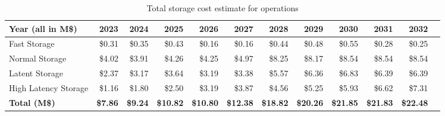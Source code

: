 \tiny \begin{longtable} { |p{}  |r  |r  |r  |r  |r  |r  |r  |r  |r  |r  |r |} 
\caption{Total storage cost estimate for operations \label{tab:opsStorageCost}}\\ 
\hline 
\textbf{Year (all in M\$)}&\textbf{2023}&\textbf{2024}&\textbf{2025}&\textbf{2026}&\textbf{2027}&\textbf{2028}&\textbf{2029}&\textbf{2030}&\textbf{2031}&\textbf{2032} \\ \hline
{Fast Storage}&{\$0.31}&{\$0.35}&{\$0.43}&{\$0.16}&{\$0.16}&{\$0.44}&{\$0.48}&{\$0.55}&{\$0.28}&{\$0.25} \\ \hline
{Normal Storage}&{\$4.02}&{\$3.91}&{\$4.26}&{\$4.25}&{\$4.97}&{\$8.25}&{\$8.17}&{\$8.54}&{\$8.54}&{\$8.54} \\ \hline
{Latent Storage}&{\$2.37}&{\$3.17}&{\$3.64}&{\$3.19}&{\$3.38}&{\$5.57}&{\$6.36}&{\$6.83}&{\$6.39}&{\$6.39} \\ \hline
{High Latency Storage}&{\$1.16}&{\$1.80}&{\$2.50}&{\$3.19}&{\$3.87}&{\$4.56}&{\$5.25}&{\$5.93}&{\$6.62}&{\$7.31} \\ \hline
\textbf{Total (M\$)}&\textbf{\$7.86}&\textbf{\$9.24}&\textbf{\$10.82}&\textbf{\$10.80}&\textbf{\$12.38}&\textbf{\$18.82}&\textbf{\$20.26}&\textbf{\$21.85}&\textbf{\$21.83}&\textbf{\$22.48} \\ \hline
\end{longtable} \normalsize
